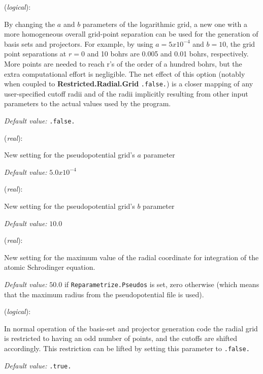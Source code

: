 \documentclass[11pt]{article}
\begin{document}
\begin{description}
\itemsep 10pt
\parsep 0pt

\item[{\bf Reparametrize.Pseudos}] ({\it logical}):

By changing the $a$ and $b$ parameters of the logarithmic grid, a new
one with a more homogeneous overall grid-point separation can be used
for the generation of basis sets and projectors. For example, by using
$a=5x10^{-4}$ and $b=10$, the grid point separations at $r=0$ and 10
bohrs are 0.005 and 0.01 bohrs, respectively. More points are needed
to reach r's of the order of a hundred bohrs, but the extra
computational effort is negligible.  The net effect of this option
(notably when coupled to {\bf Restricted.Radial.Grid} {\tt .false.})
is a closer mapping of any user-specified cutoff radii and of the
radii implicitly resulting from other input parameters to the actual
values used by the program.


{\it Default value:} { \tt .false.}

\item[{\bf New.A.Parameter}] ({\it real}):

New setting for the pseudopotential grid's $a$ parameter

{\it Default value:} { $5.0x10^{-4}$}

\item[{\bf New.B.Parameter}] ({\it real}):

New setting for the pseudopotential grid's $b$ parameter

{\it Default value:} { $10.0$}

\item[{\bf Rmax.Radial.Grid}] ({\it real}):

New setting for the maximum value of the radial coordinate for
integration of the atomic Schrodinger equation.

{\it Default value:} { $50.0$} if {\tt Reparametrize.Pseudos} is set,
zero otherwise (which means that the maximum radius from the pseudopotential
file is used).

\item[{\bf Restricted.Radial.Grid}] ({\it logical}):

In normal operation of the basis-set and projector generation code the
radial grid is restricted to having an odd number of points, and the
cutoffs are shifted accordingly. This restriction can be lifted by
setting this parameter to {\tt .false.}

{\it Default value:} { \tt .true.}
\end{description}
\end{document}
